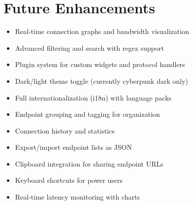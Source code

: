 \section{Future Enhancements}

\begin{itemize}
    \item Real-time connection graphs and bandwidth visualization
    \item Advanced filtering and search with regex support
    \item Plugin system for custom widgets and protocol handlers
    \item Dark/light theme toggle (currently cyberpunk dark only)
    \item Full internationalization (i18n) with language packs
    \item Endpoint grouping and tagging for organization
    \item Connection history and statistics
    \item Export/import endpoint lists as JSON
    \item Clipboard integration for sharing endpoint URLs
    \item Keyboard shortcuts for power users
    \item Real-time latency monitoring with charts
\end{itemize}

